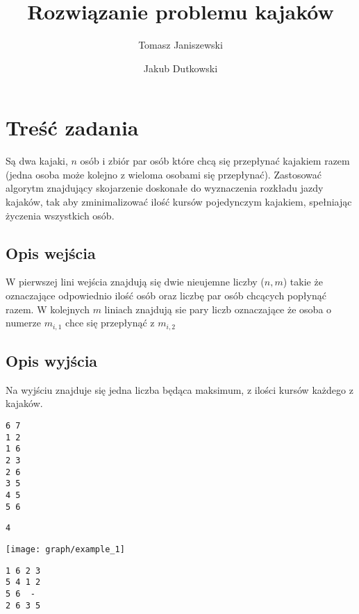 \documentclass{llncs}
\begin{document}
\title{Rozwiązanie problemu kajaków}
%
%
\author{Tomasz Janiszewski \and Jakub Dutkowski}
%
%


\maketitle              %

%
\section{Treść zadania}
Są dwa kajaki, $n$ osób i zbiór par osób które chcą się
przepłynać kajakiem razem (jedna osoba może kolejno z wieloma osobami się
przepłynać). Zastosować algorytm znajdujący skojarzenie doskonałe do
wyznaczenia rozkładu jazdy kajaków, tak aby zminimalizować ilość kursów
pojedynczym kajakiem, spełniając życzenia wszystkich osób.

\subsection{Opis wejścia}
W pierwszej lini wejścia znajdują się dwie nieujemne liczby ($n, m$) takie że oznaczające odpowiednio
ilość osób oraz liczbę par osób chcących popłynąć razem.
W kolejnych $m$ liniach znajdują sie pary liczb oznaczające że osoba o numerze $m_{i,1}$ chce się
przepłynąć z $m_{i,2}$

\subsection{Opis wyjścia}
Na wyjściu znajduje się jedna liczba będąca maksimum, z ilości kursów każdego z kajaków.


\begin{example}
\begin{lstlisting}[title=Wejście]
6 7
1 2
1 6
2 3
2 6
3 5
4 5
5 6
\end{lstlisting}
\begin{lstlisting}[title=Wyjście]
4
\end{lstlisting}

\texttt{[image: graph/example\_1]}
\begin{lstlisting}[title=Przykładowy rokład plywania]
1 6	2 3
5 4	1 2
5 6	 -
2 6	3 5
\end{lstlisting}

\end{example}
\end{document}
